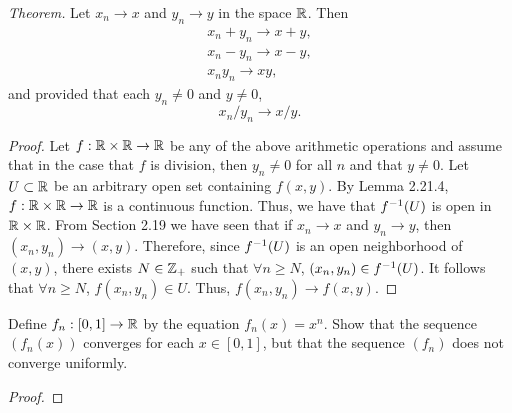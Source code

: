\begin{exercise}[ID=2.21.5]
  \textit{Theorem.} Let $x_n \rightarrow x$ and $y_n \rightarrow y$ in the space $\mathbb{R}$.
  Then
  \begin{gather*}
    x_n + y_n \rightarrow x + y, \\
      x_n - y_n \rightarrow x - y, \\
      x_n y_n \rightarrow x y,
  \end{gather*}
  and provided that each $y_n \neq 0$ and $y \neq 0$,
  \begin{equation*}
    x_n / y_n \rightarrow x / y.
  \end{equation*}
\end{exercise}
%
\begin{solution}
  \begin{proof}
    Let $f: \mathbb{R} \times \mathbb{R} \rightarrow \mathbb{R}$ be any of the above arithmetic operations and assume that in the case that $f$ is division, then $y_n \neq 0$ for all $n$ and that $y \neq 0$.
    Let $U \subset \mathbb{R}$ be an arbitrary open set containing $f(x, y)$.
    By Lemma 2.21.4, $f: \mathbb{R} \times \mathbb{R} \rightarrow \mathbb{R}$ is a continuous function.
    Thus, we have that $f^{-1}(U)$ is open in $\mathbb{R} \times \mathbb{R}$.
    From Section 2.19 we have seen that if $x_n \rightarrow x$ and $y_n \rightarrow y$, then $(x_n, y_n) \rightarrow (x, y)$.
    Therefore, since $f^{-1}(U)$ is an open neighborhood of $(x, y)$, there exists $N \in \mathbb{Z}_+$ such that $\forall n \geq N$, $(x_n, y_n) \in f^{-1}(U)$.
    It follows that $\forall n \geq N$, $f(x_n, y_n) \in U$.
    Thus, $f(x_n, y_n) \rightarrow f(x, y)$.
  \end{proof}
\end{solution}
\newpage

\begin{exercise}[ID=2.21.6]
  Define $f_n: [0, 1] \rightarrow \mathbb{R}$ by the equation $f_n(x) = x^n$.
  Show that the sequence $(f_n(x))$ converges for each $x \in [0, 1]$, but that the sequence $(f_n)$ does not converge uniformly.
\end{exercise}
%
\begin{solution}
  \begin{proof}
  \end{proof}
\end{solution}
